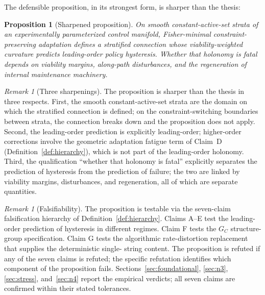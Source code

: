 \documentclass[11pt,a4paper]{article}
\theoremstyle{plain}
\newtheorem{proposition}[theorem]{Proposition}
\theoremstyle{definition}
\theoremstyle{remark}
\newtheorem{remark}[theorem]{Remark}
\begin{document}
The defensible proposition, in its strongest form, is sharper than the
thesis:

\begin{proposition}[Sharpened proposition]
\label{prop:main-sharp}
On smooth constant-active-set strata of an experimentally parameterized
control manifold, Fisher-minimal constraint-preserving adaptation
defines a stratified connection whose viability-weighted curvature
predicts leading-order policy hysteresis. Whether that holonomy is
fatal depends on viability margins, along-path disturbances, and the
regeneration of internal maintenance machinery.
\end{proposition}

\begin{remark}[Three sharpenings]
\label{rem:sharpenings}
The proposition is sharper than the thesis in three respects. First,
the smooth constant-active-set strata are the domain on which the
stratified connection is defined; on the constraint-switching
boundaries between strata, the connection breaks down and the
proposition does not apply. Second, the leading-order prediction is
explicitly leading-order; higher-order corrections involve the
geometric adaptation fatigue term of Claim~D
(Definition~\ref{def:hierarchy}), which is not part of the leading-order
holonomy. Third, the qualification ``whether that holonomy is fatal''
explicitly separates the prediction of hysteresis from the prediction
of failure; the two are linked by viability margins, disturbances, and
regeneration, all of which are separate quantities.
\end{remark}

\begin{remark}[Falsifiability]
\label{rem:main-falsifiable}
The proposition is testable via the seven-claim falsification hierarchy
of Definition~\ref{def:hierarchy}. Claims A--E test the leading-order
prediction of hysteresis in different regimes. Claim F tests the
$G_C$ structure-group specification. Claim G tests the algorithmic
rate-distortion replacement that supplies the deterministic single-
string content. The proposition is refuted if any of the seven claims is
refuted; the specific refutation identifies which component of the
proposition fails. Sections~\ref{sec:foundational}, \ref{sec:n3},
\ref{sec:stress}, and~\ref{sec:n4} report the empirical verdicts; all
seven claims are confirmed within their stated tolerances.
\end{remark}
\end{document}

